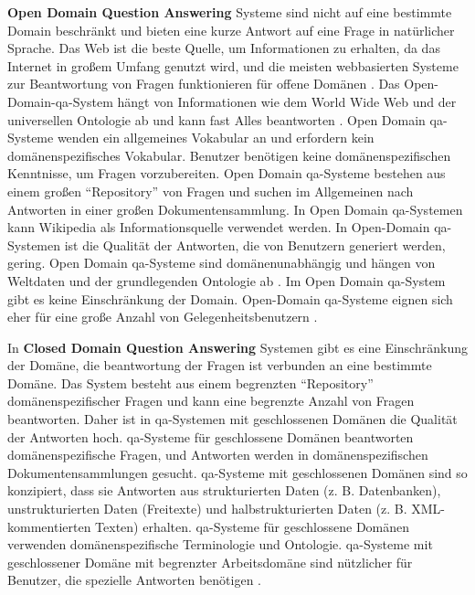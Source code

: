 \documentclass[
        ngerman,
        paper=a4,
        numbers=noendperiod,
]{scrreprt}
\begin{document}
\textbf{Open Domain Question Answering} Systeme sind nicht auf eine bestimmte Domain beschränkt und bieten eine kurze Antwort auf eine Frage in natürlicher Sprache. Das Web ist die beste Quelle, um Informationen zu erhalten, da das Internet in großem Umfang genutzt wird, und die meisten webbasierten Systeme zur Beantwortung von Fragen funktionieren für offene Domänen \citep{yogish2016survey}. Das Open-Domain-\ac{qa}-System hängt von Informationen wie dem World Wide Web und der universellen Ontologie ab und kann fast Alles beantworten \citep{SreelakshmiOPENLABELING}. Open Domain \ac{qa}-Systeme wenden ein allgemeines Vokabular an und erfordern kein domänenspezifisches Vokabular. Benutzer benötigen keine domänenspezifischen Kenntnisse, um Fragen vorzubereiten. Open Domain \ac{qa}-Systeme bestehen aus einem großen \enquote{Repository} von Fragen und suchen im Allgemeinen nach Antworten in einer großen Dokumentensammlung. In Open Domain \ac{qa}-Systemen kann Wikipedia als Informationsquelle verwendet werden. In Open-Domain \ac{qa}-Systemen ist die Qualität der Antworten, die von Benutzern generiert werden, gering. Open Domain \ac{qa}-Systeme sind domänenunabhängig und hängen von Weltdaten und der grundlegenden Ontologie ab \citep{biswas2014framework}. Im Open Domain \ac{qa}-System gibt es keine Einschränkung der Domain. Open-Domain \ac{qa}-Systeme eignen sich eher für eine große Anzahl von Gelegenheitsbenutzern \citep[S. 20]{ChandraASystem}.

In \textbf{Closed Domain Question Answering} Systemen gibt es eine Einschränkung der Domäne, die beantwortung der Fragen ist verbunden an eine bestimmte Domäne. Das System besteht aus einem begrenzten \enquote{Repository} domänenspezifischer Fragen und kann eine begrenzte Anzahl von Fragen beantworten. Daher ist in \ac{qa}-Systemen mit geschlossenen Domänen die Qualität der Antworten hoch. \ac{qa}-Systeme für geschlossene Domänen beantworten domänenspezifische Fragen, und Antworten werden in domänenspezifischen Dokumentensammlungen gesucht. \ac{qa}-Systeme mit geschlossenen Domänen sind so konzipiert, dass sie Antworten aus strukturierten Daten (z. B. Datenbanken), unstrukturierten Daten (Freitexte) und halbstrukturierten Daten (z. B. XML-kommentierten Texten) erhalten. \ac{qa}-Systeme für geschlossene Domänen verwenden domänenspezifische Terminologie und Ontologie. \ac{qa}-Systeme mit geschlossener Domäne mit begrenzter Arbeitsdomäne sind nützlicher für Benutzer, die spezielle Antworten benötigen \citep[S. 20]{ChandraASystem}.
\end{document}

